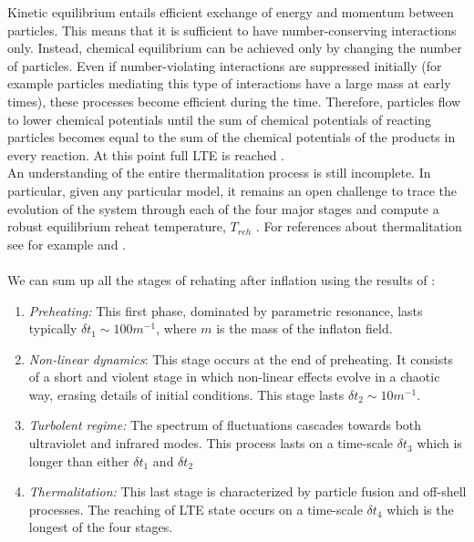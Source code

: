 \documentclass[11pt,a4paper,twoside]{book}
\begin{document}
Kinetic equilibrium entails efficient exchange of energy and momentum between particles. This means that it is sufficient to have number-conserving interactions only. Instead, chemical equilibrium can be achieved only by changing the number of particles. Even if number-violating interactions are suppressed initially (for example particles mediating this type of interactions have a large mass at early times), these processes become efficient during the time.  Therefore, particles flow to lower chemical potentials until the sum of chemical potentials of reacting particles becomes equal to the sum of the chemical potentials of the products in every reaction. At this point full LTE is reached \cite{Chap4:Lozanov}.\\
An understanding of the entire thermalitation process is still incomplete. In particular, given any particular model, it remains an open challenge to trace the evolution of the system through each of the four major stages and compute a robust equilibrium reheat temperature, $ T_{reh} $ \cite{Chap4:AminHetrzberg}. For references about thermalitation see for example \cite{Chap4:AminHetrzberg} and \cite{Chap4:Lozanov}.\\ 
\\
We can sum up all the stages of rehating after inflation using the results of \cite{Chap7:Peloso_Thermalitation}:
\begin{enumerate}
	\item \textit{Preheating:} This first phase, dominated by parametric resonance, lasts typically $\delta t_{1} \sim 100 m^{-1}$, where $ m $ is the mass of the inflaton field.
	
	\item \textit{Non-linear dynamics}: This stage occurs at the end of preheating. It consists of a short and violent stage in which non-linear effects evolve in a chaotic way, erasing details of initial conditions. This stage lasts $ \delta t_{2} \sim 1 0m^{-1} $.
	
	\item \textit{Turbolent regime:} The spectrum of fluctuations cascades towards both ultraviolet and infrared modes. This process lasts on a time-scale $\delta t_{3}$ which is longer than either $\delta t_{1}$ and $ \delta t_{2} $
	
	\item \textit{Thermalitation:} This last stage is characterized by particle fusion and off-shell processes. The reaching of LTE state occurs on a time-scale $\delta t_{4}$ which is the longest of the four stages.  
\end{enumerate}
\end{document}
